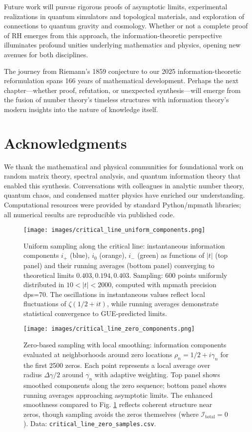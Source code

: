 \documentclass[12pt]{article}
\theoremstyle{plain}
\theoremstyle{definition}
\begin{document}
Future work will pursue rigorous proofs of asymptotic limits, experimental realizations in quantum simulators and topological materials, and exploration of connections to quantum gravity and cosmology. Whether or not a complete proof of RH emerges from this approach, the information-theoretic perspective illuminates profound unities underlying mathematics and physics, opening new avenues for both disciplines.

The journey from Riemann's 1859 conjecture to our 2025 information-theoretic reformulation spans 166 years of mathematical development. Perhaps the next chapter—whether proof, refutation, or unexpected synthesis—will emerge from the fusion of number theory's timeless structures with information theory's modern insights into the nature of knowledge itself.

\section*{Acknowledgments}

We thank the mathematical and physical communities for foundational work on random matrix theory, spectral analysis, and quantum information theory that enabled this synthesis. Conversations with colleagues in analytic number theory, quantum chaos, and condensed matter physics have enriched our understanding. Computational resources were provided by standard Python/mpmath libraries; all numerical results are reproducible via published code.

\begin{figure}[H]
\centering
\texttt{[image: images/critical\_line\_uniform\_components.png]}
\caption{Uniform sampling along the critical line: instantaneous information components $i_+$ (blue), $i_0$ (orange), $i_-$ (green) as functions of $|t|$ (top panel) and their running averages (bottom panel) converging to theoretical limits $0.403, 0.194, 0.403$. Sampling: 600 points uniformly distributed in $10 < |t| < 2000$, computed with mpmath precision dps=70. The oscillations in instantaneous values reflect local fluctuations of $\zeta(1/2+it)$, while running averages demonstrate statistical convergence to GUE-predicted limits.}
\label{fig:uniform_components}
\end{figure}

\begin{figure}[H]
\centering
\texttt{[image: images/critical\_line\_zero\_components.png]}
\caption{Zero-based sampling with local smoothing: information components evaluated at neighborhoods around zero locations $\rho_n = 1/2 + i\gamma_n$ for the first 2500 zeros. Each point represents a local average over radius $\Delta \gamma / 2$ around $\gamma_n$ with adaptive weighting. Top panel shows smoothed components along the zero sequence; bottom panel shows running averages approaching asymptotic limits. The enhanced smoothness compared to Fig. \ref{fig:uniform_components} reflects coherent structure near zeros, though sampling avoids the zeros themselves (where $\mathcal{I}_{\text{total}} = 0$). Data: \texttt{critical\_line\_zero\_samples.csv}.}
\label{fig:zero_components}
\end{figure}
\end{document}
